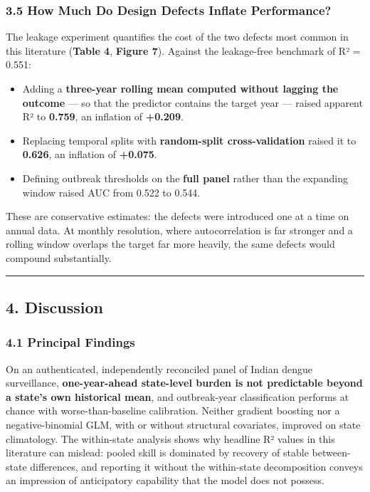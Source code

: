 \documentclass[
  10pt,
  twocolumn]{article}
\providecommand{\tightlist}{%
  \setlength{\itemsep}{0pt}\setlength{\parskip}{0pt}}
\begin{document}
\subsubsection{3.5 How Much Do Design Defects Inflate
Performance?}\label{how-much-do-design-defects-inflate-performance}

The leakage experiment quantifies the cost of the two defects most
common in this literature (\textbf{Table 4}, \textbf{Figure 7}). Against
the leakage-free benchmark of R² = 0.551:

\begin{itemize}
\tightlist
\item
  Adding a \textbf{three-year rolling mean computed without lagging the
  outcome} --- so that the predictor contains the target year --- raised
  apparent R² to \textbf{0.759}, an inflation of \textbf{+0.209}.
\item
  Replacing temporal splits with \textbf{random-split cross-validation}
  raised it to \textbf{0.626}, an inflation of \textbf{+0.075}.
\item
  Defining outbreak thresholds on the \textbf{full panel} rather than
  the expanding window raised AUC from 0.522 to 0.544.
\end{itemize}

These are conservative estimates: the defects were introduced one at a
time on annual data. At monthly resolution, where autocorrelation is far
stronger and a rolling window overlaps the target far more heavily, the
same defects would compound substantially.

\begin{center}\rule{0.5\linewidth}{0.5pt}\end{center}

\subsection{4. Discussion}\label{discussion}

\subsubsection{4.1 Principal Findings}\label{principal-findings}

On an authenticated, independently reconciled panel of Indian dengue
surveillance, \textbf{one-year-ahead state-level burden is not
predictable beyond a state's own historical mean}, and outbreak-year
classification performs at chance with worse-than-baseline calibration.
Neither gradient boosting nor a negative-binomial GLM, with or without
structural covariates, improved on state climatology. The within-state
analysis shows why headline R² values in this literature can mislead:
pooled skill is dominated by recovery of stable between-state
differences, and reporting it without the within-state decomposition
conveys an impression of anticipatory capability that the model does not
possess.
\end{document}
